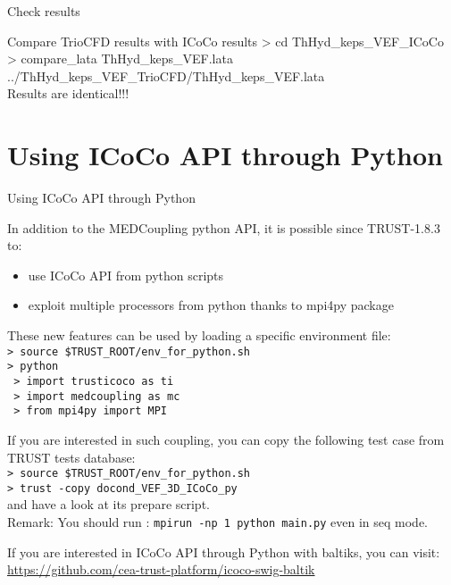 \documentclass[10pt, hyperref={unicode=true,pdfusetitle, bookmarks=true,bookmarksnumbered=false,bookmarksopen=false, breaklinks=false,pdfborder={0 0 1},backref=true,colorlinks=true,linkcolor=darkblue,pageanchor, urlcolor=darkblue}]{beamer}
\begin{document}
\begin{frame}{Check results}

\begin{block}{Compare TrioCFD results with ICoCo results}
> cd ThHyd\_keps\_VEF\_ICoCo \\
> compare\_lata ThHyd\_keps\_VEF.lata ../ThHyd\_keps\_VEF\_TrioCFD/ThHyd\_keps\_VEF.lata \\
Results are identical!!!
\end{block}
\end{frame}
\section{{\bf{Using ICoCo API through Python}}}
\begin{frame}
\end{frame}
\begin{frame}{Using ICoCo API through Python}

\begin{block}{}
In addition to the MEDCoupling python API, it is possible since TRUST-1.8.3 to:
\begin{itemize}
\item use ICoCo API from python scripts
\item exploit multiple processors from python thanks to mpi4py package
\end{itemize}
These new features can be used by loading a specific environment file: \\
\texttt{> source \$TRUST\_ROOT/env\_for\_python.sh} \\
\texttt{> python} \\
\texttt{  > import trusticoco as ti }\\
\texttt{  > import medcoupling as mc}\\
\texttt{  > from mpi4py import MPI}


If you are interested in such coupling, you can copy the following test case from TRUST tests database:\\
\texttt{> source \$TRUST\_ROOT/env\_for\_python.sh} \\
\texttt{> trust -copy docond\_VEF\_3D\_ICoCo\_py} \\
and have a look at its prepare script. \\

Remark: You should run : \texttt{mpirun -np 1 python main.py} even in seq mode.

If you are interested in ICoCo API through Python with baltiks, you can visit:
\url{https://github.com/cea-trust-platform/icoco-swig-baltik}

\end{block}
\end{frame}
\end{document}
